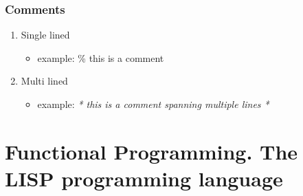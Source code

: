 \documentclass[11pt]{article}
\begin{document}
\subsubsection{Comments}
\label{sec:org3216a3a}
\begin{enumerate}
\item Single lined
\label{sec:orgdb8ae95}
\begin{itemize}
\item example: \% this is a comment
\end{itemize}
\item Multi lined
\label{sec:orgc3f6101}
\begin{itemize}
\item example: \emph{* this is a comment
spanning multiple lines *}
\end{itemize}
\end{enumerate}
\section{Functional Programming. The LISP programming language}
\label{sec:org4ab68bc}
\end{document}
